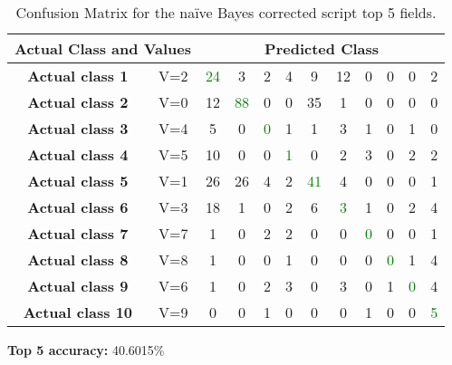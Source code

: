 \documentclass[a4paper,10pt]{article}
\begin{document}
      \begin{table}[ht!] 
        \centering
        \caption{Confusion Matrix for the na\"{i}ve Bayes corrected script top 5 fields.}
        \begin{tabular}{|c|c||c|c|c|c|c|c|c|c|c|c|}
          \hline
           \multicolumn{2}{|c||}{\textbf{Actual Class and Values}}&    
          \multicolumn{10}{|c|}{\textbf{Predicted Class}} \\ \hline
          \textbf{Actual class 1}& V=2  &\textcolor{green}{24} &3 &2 &4 &9 &12 &0 &0 &0 &2  \\
          \textbf{Actual class 2}& V=0  &12 &\textcolor{green}{88} &0 &0 &35 &1 &0 &0 &0 &0  \\
          \textbf{Actual class 3}& V=4  &5 &0 &\textcolor{green}{0} &1 &1 &3 &1 &0 &1 &0  \\
          \textbf{Actual class 4}& V=5  &10 &0 &0 &\textcolor{green}{1} &0 &2 &3 &0 &2 &2  \\
          \textbf{Actual class 5}& V=1  &26 &26 &4 &2 &\textcolor{green}{41} &4 &0 &0 &0 &1   \\
          \textbf{Actual class 6}& V=3  &18 &1 &0 &2 &6 &\textcolor{green}{3} &1 &0 &2 &4   \\
          \textbf{Actual class 7}& V=7  &1 &0 &2 &2 &0 &0 &\textcolor{green}{0} &0 &0 &1   \\
          \textbf{Actual class 8}& V=8  &1 &0 &0 &1 &0 &0 &0 &\textcolor{green}{0} &1 &4  \\
          \textbf{Actual class 9}& V=6  &1 &0 &2 &3 &0 &3 &0 &1 &\textcolor{green}{0} &4   \\
          \textbf{Actual class 10}&V=9  &0 &0 &1 &0 &0 &0 &1 &0 &0 &\textcolor{green}{5}   \\
          \hline
        \end{tabular}
      \end{table} 
      \textbf{Top 5 accuracy:} 40.6015\% 
\end{document}
